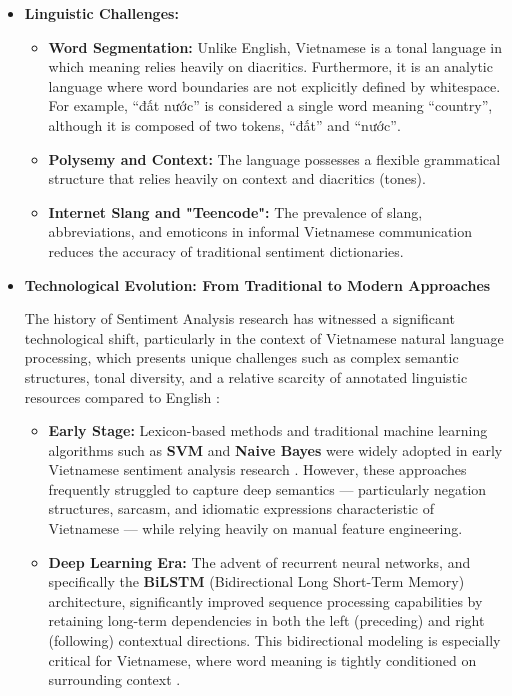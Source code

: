 \documentclass[12pt]{report} %
\begin{document}
\begin{itemize}
    \item \textbf{Linguistic Challenges:}
          \begin{itemize}
              \item \textbf{Word Segmentation:} Unlike English, Vietnamese is a tonal language in which meaning relies heavily on diacritics. Furthermore, it is an analytic language where word boundaries are not explicitly defined by whitespace. For example, \foreignlanguage{vietnamese}{``đất nước''} is considered
                    a single word meaning ``country'', although it is composed of two tokens, \foreignlanguage{vietnamese}{``đất''} and \foreignlanguage{vietnamese}{``nước''}.

              \item \textbf{Polysemy and Context:} The language possesses a flexible grammatical structure that relies heavily on context and diacritics (tones).

              \item \textbf{Internet Slang and "Teencode":} The prevalence of slang, abbreviations, and emoticons in informal Vietnamese communication reduces the accuracy of traditional sentiment dictionaries.
          \end{itemize}

    \item \textbf{Technological Evolution: From Traditional to Modern Approaches}

          The history of Sentiment Analysis research has witnessed a significant technological shift, particularly in the context of Vietnamese natural language processing, which presents unique challenges such as complex semantic structures, tonal diversity, and a relative scarcity of annotated linguistic resources compared to English \cite{nguyen2018vlsp, nguyen2018variants}:

          \begin{itemize}
              \item \textbf{Early Stage:} Lexicon-based methods and traditional machine learning algorithms such as \textbf{SVM} and \textbf{Naive Bayes} were widely adopted in early Vietnamese sentiment analysis research \cite{nguyen2018vlsp}. However, these approaches frequently struggled to capture deep semantics --- particularly negation structures, sarcasm, and idiomatic expressions characteristic of Vietnamese --- while relying heavily on manual feature engineering.

              \item \textbf{Deep Learning Era:} The advent of recurrent neural networks, and specifically the \textbf{BiLSTM} (Bidirectional Long Short-Term Memory) architecture, significantly improved sequence processing capabilities by retaining long-term dependencies in both the left (preceding) and right (following) contextual directions. This bidirectional modeling is especially critical for Vietnamese, where word meaning is tightly conditioned on surrounding context \cite{nguyen2018variants}.


\end{itemize}
\end{itemize}
\end{document}
